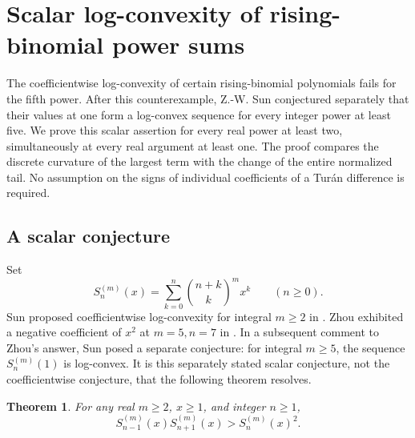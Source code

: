 \documentclass[11pt,a4paper]{article}
\numberwithin{equation}{section}
\newtheorem{theorem}{Theorem}[section]
\theoremstyle{definition}
\theoremstyle{remark}
\newenvironment{sectionabstract}{\par\smallskip\begingroup\small\noindent}{\par\endgroup\medskip}
\begin{document}
\par\endgroup

\begingroup
\newcommand{\bin}[2]{\binom{#1}{#2}}
\newcommand{\dd}{\displaystyle}
\section{\texorpdfstring{Scalar log-convexity of rising-binomial power sums}{Scalar log-convexity of rising-binomial power sums}}\label{section:r28keio}
\par\medskip


\begin{sectionabstract}
The coefficientwise log-convexity of certain rising-binomial polynomials fails for the fifth power. After this counterexample, Z.-W. Sun conjectured separately that their values at one form a log-convex sequence for every integer power at least five. We prove this scalar assertion for every real power at least two, simultaneously at every real argument at least one. The proof compares the discrete curvature of the largest term with the change of the entire normalized tail. No assumption on the signs of individual coefficients of a Tur\'an difference is required.
\end{sectionabstract}
\subsection{A scalar conjecture}
Set
\[
 S_n^{(m)}(x)=\sum_{k=0}^n \bin{n+k}{k}^{m}x^k
 \qquad(n\ge0).
\]
Sun proposed coefficientwise log-convexity for integral $m\ge2$ in \cite{r28keio:mo,r28keio:sun}. Zhou exhibited a negative coefficient of $x^2$ at $m=5,n=7$ in \cite{r28keio:mo}. In a subsequent comment to Zhou's answer, Sun posed a separate conjecture: for integral $m\ge5$, the sequence $S_n^{(m)}(1)$ is log-convex. It is this separately stated scalar conjecture, not the coefficientwise conjecture, that the following theorem resolves.
\begin{theorem}
For any real $m\ge2$, $x\ge1$, and integer $n\ge1$,
\[
 S_{n-1}^{(m)}(x)S_{n+1}^{(m)}(x)> S_n^{(m)}(x)^2 .
\]
\end{theorem}
\end{document}
